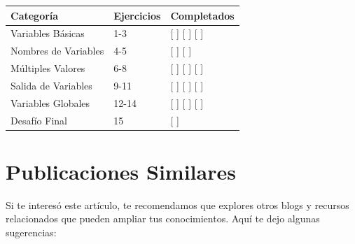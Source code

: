 \documentclass[
  doc,
  floatsintext,
  longtable,
  a4paper,
  nolmodern,
  notxfonts,
  notimes,
  12pt,
  colorlinks=true,linkcolor=blue,citecolor=blue,urlcolor=blue]{apa7}
\newcounter{none} %
\begin{document}
{\def\LTcaptype{none} %
\begin{longtable}[]{@{}lll@{}}
\toprule\noalign{}
Categoría & Ejercicios & Completados \\
\midrule\noalign{}
\endhead
\bottomrule\noalign{}
\endlastfoot
Variables Básicas & 1-3 & {[} {]} {[} {]} {[} {]} \\
Nombres de Variables & 4-5 & {[} {]} {[} {]} \\
Múltiples Valores & 6-8 & {[} {]} {[} {]} {[} {]} \\
Salida de Variables & 9-11 & {[} {]} {[} {]} {[} {]} \\
Variables Globales & 12-14 & {[} {]} {[} {]} {[} {]} \\
Desafío Final & 15 & {[} {]} \\
\end{longtable}
}

\section{Publicaciones Similares}\label{publicaciones-similares}

Si te interesó este artículo, te recomendamos que explores otros blogs y
recursos relacionados que pueden ampliar tus conocimientos. Aquí te dejo
algunas sugerencias:
\end{document}
